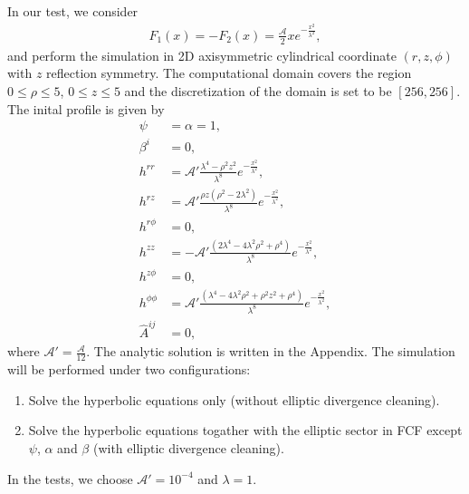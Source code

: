 In our test, we consider 
\begin{align}
    F_1 (x) = - F_2 (x) = \frac{\mathcal{A}}{2} x e^{-\frac{x^2}{\lambda^2}},
\end{align}
and perform the simulation in 2D axisymmetric cylindrical coordinate $(r,z,\phi)$ with $z$ reflection symmetry.
The computational domain covers the region $0\leq \rho \leq 5$, $0\leq z \leq 5$
and the discretization of the domain is set to be $[256,256]$.
The inital profile is given by
\begin{align}
    \psi &= \alpha = 1, \\
    \beta^i &= 0, \\
    h^{rr} &= \mathcal{A}' \frac{\lambda^4 - \rho^2 z^2}{\lambda^8} e^{-\frac{x^2}{\lambda^2}}, \\
    h^{r z} &= \mathcal{A}' \frac{\rho z \left(\rho^2 - 2 \lambda^2 \right)}{\lambda^8} e^{-\frac{x^2}{\lambda^2}}, \\
    h^{r \phi} &= 0, \\
    h^{zz} &= - \mathcal{A}' \frac{\left(2 \lambda^4 - 4 \lambda^2 \rho^2 + \rho^4 \right)}{\lambda^8} e^{-\frac{x^2}{\lambda^2}}, \\
    h^{z\phi} &= 0, \\
    h^{\phi\phi} &= \mathcal{A}' \frac{\left(\lambda^4 - 4 \lambda^2 \rho^2 +\rho^2 z^2 + \rho^4 \right)}{\lambda^8} e^{-\frac{x^2}{\lambda^2}}, \\
    \hat{A}^{ij} &= 0,
\end{align}
where $\mathcal{A}' = \frac{\mathcal{A}}{12}$.
The analytic solution is written in the Appendix.
The simulation will be performed under two configurations:
\begin{enumerate}
    \item Solve the hyperbolic equations only (without elliptic divergence cleaning).
    \label{TW_config_1}
    \item Solve the hyperbolic equations togather with the elliptic sector in FCF except $\psi$, $\alpha$ and $\beta$ (with elliptic divergence cleaning).
    \label{TW_config_2}
\end{enumerate}
In the tests, we choose $\mathcal{A}'=10^{-4}$ and $\lambda=1$.
